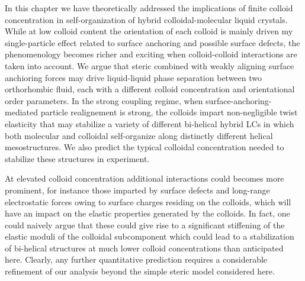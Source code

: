 In this chapter we have theoretically addressed the implications of finite colloid concentration in self-organization of hybrid colloidal-molecular liquid crystals. While at low colloid content the orientation of each colloid is mainly driven my single-particle effect related to surface anchoring and possible surface defects, the phenomenology becomes richer and exciting when colloid-colloid interactions are taken into account. We argue that steric combined with weakly aligning surface anchioring forces may drive liquid-liquid phase separation between two orthorhombic fluid, each with a different colloid concentration and orientational order parameters. In the strong coupling regime, when surface-anchoring-mediated  particle realignement is strong, the colloids impart non-negligible twist elasticity that may stabilize a variety of different bi-helical hybrid LCs in which both molecular and colloidal self-organize along distinctly different helical mesostructures. We also predict the typical colloidal concentration needed to stabilize these structures in experiment. 

At elevated colloid concentration additional interactions could becomes more prominent, for instance those imparted by surface defects and long-range electrostatic forces owing to surface charges residing on the colloids, which will have an impact on the elastic properties generated by the colloids. In fact, one could naively argue  that these could give rise to a significant stiffening of the elastic moduli of the colloidal subcomponent which could lead to a stabilization of bi-helical structures at much lower colloid concentrations than anticipated here.   Clearly, any further quantitative prediction requires a considerable refinement of our analysis beyond the simple steric model considered here.  














